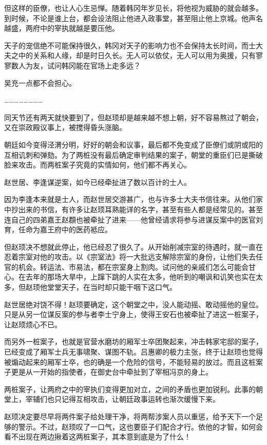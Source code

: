 但这样的臣僚，也让人心生忌惮。随着韩冈年岁见长，将他视为威胁的就会越多。到时候，不论是谁上台，都会设法阻止他进入政事堂，甚至阻止他上京城。他声名越盛，两府中的宰执就越是要压他。

天子的宠信绝不可能保持很久，韩冈对天子的影响力也不会保持太长时间，而士大夫之中的关系和人缘，却是时日久长。无人可以依仗，无人可以用为奥援，只有寥寥数人为友，试问韩冈能在官场上走多远？

吴充一点都不会担心。

……………………

同天节还有两天就快要到了，但赵顼却是越来越不想上朝，好不容易熬过了朝会，又在崇政殿议事上，被搅得昏头涨脑。

朝廷如今变得泾渭分明，好好的朝会和议事，最后都不免变成了臣僚们或阴或阳的互相讥刺和弹劾。为了两桩没有最后确定审判结果的案子，朝堂的重臣们已是撕破脸来攻击。而两桩案子究竟的实情如何，他们都不再关心。

赵世居、李逢谋逆案，如今已经牵扯进了数以百计的士人。

因为李逢本来就是士人，而赵世居交游甚广，也与许多士大夫书信往来。从他们家中抄出来的书信，有许多让赵顼耳熟能详的名字，甚至有些人都是经常见的。甚至连自己的四弟嘉王赵頵也被牵扯了进来——他曾经请求将参与进谋反案中的医官刘育，任命为嘉王府中的医药袛应。

但赵顼决不想就此停止，他已经忍了很久了。从开始削减宗室的待遇时，就一直在忍着宗室对他的攻击。以《宗室法》将一大批远支解除宗室的身份，让他们失去任官的机会。转运法、市易法，都在宗室身上割肉。试问他的亲戚们怎么可能会甘心。在去年的那场大旱中，上蹿下跳的人实在太多，他听到的嘲讽和讥笑也实在太多，但赵顼他堂堂天子，在当时却只能干咽下这口气。

赵世居绝对饶不得！赵顼要确定，这个朝堂之中，没人能动摇、敢动摇他的皇位。只是从另一位谋反案的参与者李士宁身上，使得王安石也被牵扯了进这一桩案子，让赵顼烦心不已。

而另外一桩案子，也就是官营水磨坊的厢军士卒团聚起来，冲击韩家宅邸的案子，已经变成了厢军士兵无事啸聚、谋图不轨。吕惠卿的极力主张，终于让赵顼也觉得被煽动起来的厢军士卒，也的确是一个危险的信号，不能轻易的放过。而且这桩案子更是从一开始的指使者，在御史台中牵扯到了宰相冯京的身上。

两桩案子，让两府之中的宰执们变得更加对立，之间的矛盾也更加锐利。此事的朝堂上，宰辅们也只记得互相攻击，让朝廷政事运转也渐次缓慢下来。

赵顼决定要尽早将两件案子给处理干净，将两帮涉案人员以重惩，给予天下一个足够的警示。不过，赵顼叹了一口气，这也要臣子们配合才行。依他的才智，如何会看不出现在两边揪着这两桩案子，其本意到底是为了什么！

